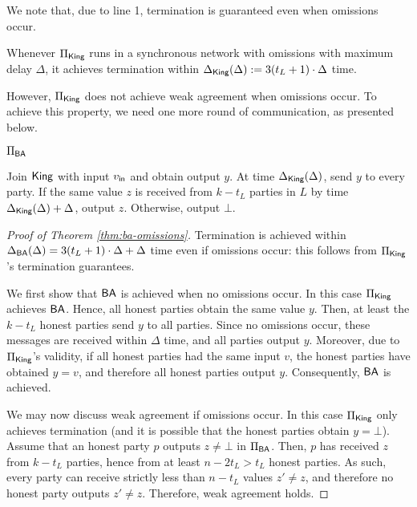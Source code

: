 We note that, due to line 1, termination is guaranteed even when omissions occur.
\begin{remark}
    Whenever $\Pi_{\textsf{King}}$ runs in a synchronous network with omissions with maximum delay $\Delta$, it achieves termination within $\Delta_{\textsf{King}}(\Delta) := 3(t_L + 1) \cdot \Delta$ time.
\end{remark}

However, $\Pi_{\textsf{King}}$ does not achieve weak agreement when omissions occur. To achieve this property, we need one more round of communication, as presented below.

\begin{protocolbox}{$\Pi_{\textsf{BA}}$}
    \begin{algorithmic}[1]
    \State Join $\textsf{King}$ with input $v_{\textsf{in}}$ and obtain output $y$.
    \State At time $\Delta_{\textsf{King}}(\Delta)$, send $y$ to every party.
    \State If the same value $z$ is received from $k - t_L$ parties in $L$ by time $\Delta_{\textsf{King}}(\Delta) + \Delta$, output $z$. Otherwise, output $\bot$.
\end{algorithmic}
\end{protocolbox}


\begin{proof}[Proof of Theorem \ref{thm:ba-omissions}]
Termination  is achieved within $\Delta_{\textsf{BA}}(\Delta) = 3(t_L + 1) \cdot \Delta + \Delta$ time even if omissions occur: this follows from $\Pi_{\textsf{King}}$'s termination guarantees. 

We first show that $\textsf{BA}$ is achieved when no omissions occur. In this case $\Pi_{\textsf{King}}$ achieves $\textsf{BA}$. Hence, all honest parties obtain the same value $y$. Then, at least the $k - t_L$ honest parties send $y$ to all parties. Since no omissions occur, these messages are received within $\Delta$ time, and all parties output $y$. Moreover, due to $\Pi_{\textsf{King}}$'s validity, if all honest parties had the same input $v$, the honest parties have obtained $y = v$, and therefore all honest parties output $y$. Consequently, $\textsf{BA}$ is achieved.


We may now discuss weak agreement if omissions occur. In this case $\Pi_{\textsf{King}}$ only achieves termination (and it is possible that the honest parties obtain $y = \bot$). Assume that an honest party $p$ outputs $z \neq \bot$ in $\Pi_{\textsf{BA}}$. Then, $p$ has received $z$ from $k - t_L$ parties, hence from at least $n - 2t_L > t_L$ honest parties. As such, every party can receive strictly less than $n - t_L$ values $z' \neq z$, and therefore no honest party outputs $z' \neq z$.  Therefore, weak agreement holds.
\end{proof}


